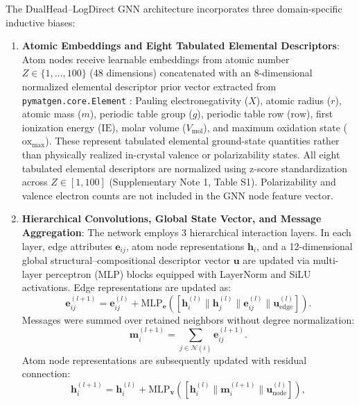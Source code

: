 \documentclass[final,3p,times]{elsarticle}
\begin{document}
The DualHead--LogDirect GNN architecture incorporates three domain-specific inductive biases:
\begin{enumerate}
    \item \textbf{Atomic Embeddings and Eight Tabulated Elemental Descriptors}: Atom nodes receive learnable embeddings from atomic number $Z \in \{1, \dots, 100\}$ (48 dimensions) concatenated with an 8-dimensional normalized elemental descriptor prior vector extracted from \texttt{pymatgen.core.Element} \cite{ong2013python}: Pauling electronegativity ($X$), atomic radius ($r$), atomic mass ($m$), periodic table group ($g$), periodic table row ($\text{row}$), first ionization energy ($\text{IE}$), molar volume ($V_{\mathrm{mol}}$), and maximum oxidation state ($\text{ox}_{\max}$). These represent tabulated elemental ground-state quantities rather than physically realized in-crystal valence or polarizability states. All eight tabulated elemental descriptors are normalized using z-score standardization across $Z \in [1, 100]$ (Supplementary Note 1, Table S1). Polarizability and valence electron counts are not included in the GNN node feature vector.
    \item \textbf{Hierarchical Convolutions, Global State Vector, and Message Aggregation}: The network employs 3 hierarchical interaction layers. In each layer, edge attributes $\mathbf{e}_{ij}$, atom node representations $\mathbf{h}_i$, and a 12-dimensional global structural--compositional descriptor vector $\mathbf{u}$ are updated via multi-layer perceptron (MLP) blocks equipped with LayerNorm and SiLU activations. Edge representations are updated as:
    \begin{equation}
        \mathbf{e}_{ij}^{(l+1)} = \mathbf{e}_{ij}^{(l)} + \mathrm{MLP}_{\mathbf{e}}\left([\mathbf{h}_i^{(l)} \parallel \mathbf{h}_j^{(l)} \parallel \mathbf{e}_{ij}^{(l)} \parallel \mathbf{u}_{\mathrm{edge}}^{(l)}]\right).
    \end{equation}
    Messages were summed over retained neighbors without degree normalization:
    \begin{equation}
        \mathbf{m}_i^{(l+1)} = \sum_{j \in \mathcal{N}(i)} \mathbf{e}_{ij}^{(l+1)}.
    \end{equation}
    Atom node representations are subsequently updated with residual connection:
    \begin{equation}
        \mathbf{h}_i^{(l+1)} = \mathbf{h}_i^{(l)} + \mathrm{MLP}_{\mathbf{v}}\left([\mathbf{h}_i^{(l)} \parallel \mathbf{m}_i^{(l+1)} \parallel \mathbf{u}_{\mathrm{node}}^{(l)}]\right),

\end{equation}
\end{enumerate}
\end{document}
